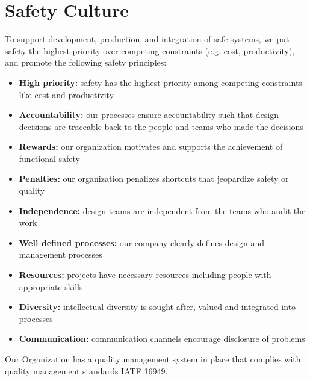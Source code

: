 \chapter{Safety Culture}
\label{ch:safety_culture}


To support development, production, and integration of safe systems, 
we put safety the highest priority over competing constraints (e.g. cost, productivity), 
and promote the following safety principles:

\begin{itemize}
  \item \textbf{High priority:} safety has the highest priority among competing
	constraints like cost and productivity
  \item \textbf{Accountability:} our processes ensure accountability such that design
	decisions are traceable back to the people and teams who made the decisions
  \item \textbf{Rewards:} our organization motivates and supports the achievement
	of functional safety
  \item \textbf{Penalties:} our organization penalizes shortcuts that
	jeopardize safety or quality
  \item \textbf{Independence:} design teams are independent from the teams who audit the work
  \item \textbf{Well defined processes:} our company clearly defines design and management
	processes
  \item \textbf{Resources:} projects have necessary resources including people
	with appropriate skills
  \item \textbf{Diversity:} intellectual diversity is sought after, valued and
	integrated into processes
  \item \textbf{Communication:} communication channels encourage disclosure of
	problems
\end{itemize}

Our Organization has a quality management system in place that complies
with quality management standards IATF 16949.
